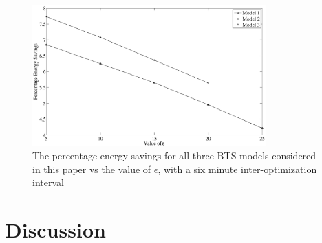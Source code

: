 \begin{figure}
\centering
\includegraphics[width=0.8\textwidth]{pics/epsilonresults.eps}
\caption{The percentage energy savings for all three BTS models considered in this paper vs the value of $\epsilon$, with a six minute inter-optimization interval}
\label{fig:case2:results6}
\end{figure}

\section{Discussion}